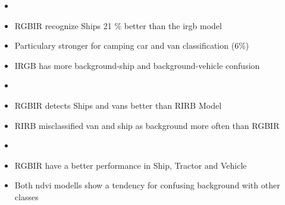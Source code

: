 \begin{itemize}
    \item {}
    \item RGBIR recognize Ships 21 \% better than the irgb model
    \item Particulary stronger for camping car and van classification (6\%)
    \item IRGB has more  background-ship and background-vehicle confusion
\end{itemize}

\begin{itemize}
    \item {}
    \item RGBIR detects Ships and vans better than RIRB Model
    \item RIRB misclassified van and ship as background more often than RGBIR

\end{itemize}


\begin{itemize}
    \item {}
    \item RGBIR have a better performance in Ship, Tractor and Vehicle
    \item Both ndvi modells show  a tendency for confusing background with other classes
\end{itemize}

